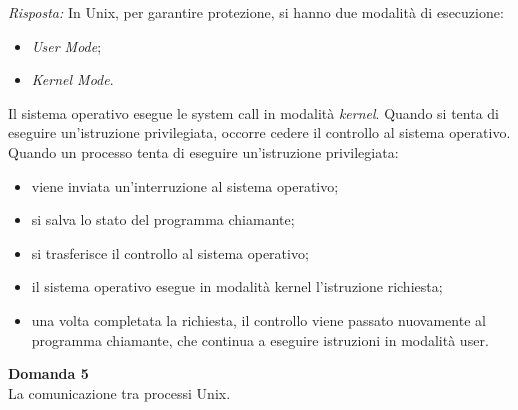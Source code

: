 \documentclass{article}
\newenvironment{problem}[2][Domanda]
    { \begin{mdframed}[backgroundcolor=gray!20] \textbf{#1 #2} \\}
    {  \end{mdframed}}
\newenvironment{solution}
    {\textit{Risposta:}}
    {}
\begin{document}
\begin{solution}
In Unix, per garantire protezione, si hanno due modalità di esecuzione:
\begin{itemize}
    \item \emph{User Mode};
    \item \emph{Kernel Mode}.
\end{itemize}
Il sistema operativo esegue le system call in modalità \textit{kernel}. Quando si tenta di eseguire un’istruzione privilegiata, occorre cedere il controllo al sistema operativo.
\newline
Quando un processo tenta di eseguire un’istruzione privilegiata:
\begin{itemize}
    \item viene inviata un’interruzione al sistema operativo;
    \item si salva lo stato del programma chiamante;
    \item si trasferisce il controllo al sistema operativo;
    \item il sistema operativo esegue in modalità kernel l’istruzione richiesta;
    \item una volta completata la richiesta, il controllo viene passato nuovamente al programma chiamante, che continua a eseguire istruzioni in modalità user.
\end{itemize}
\end{solution}
\begin{problem}{5}
La comunicazione tra processi Unix.
\end{problem}
\end{document}
